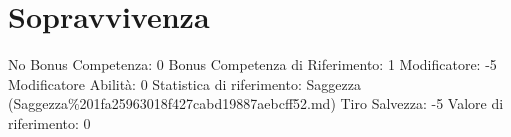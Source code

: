 \section{Sopravvivenza}\label{sopravvivenza}

\begin{description}
\tightlist
\item[Tags: ABI]
No Bonus Competenza: 0 Bonus Competenza di Riferimento: 1 Modificatore:
-5 Modificatore Abilità: 0 Statistica di riferimento: Saggezza
(Saggezza\%201fa25963018f427cabd19887aebcff52.md) Tiro Salvezza: -5
Valore di riferimento: 0
\end{description}
